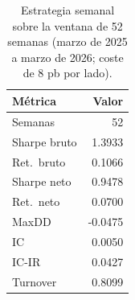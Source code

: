 \begin{table}[htbp]
\centering
\caption{Estrategia semanal sobre la ventana de 52 semanas (marzo de 2025 a marzo de
2026; coste de 8 pb por lado).}
\label{tab:weekly-summary}
\small
\begin{tabular}{lr}
\toprule
Métrica & Valor \\
\midrule
Semanas        & 52 \\
Sharpe bruto   & 1.3933 \\
Ret.\ bruto    & 0.1066 \\
Sharpe neto    & 0.9478 \\
Ret.\ neto     & 0.0700 \\
MaxDD          & -0.0475 \\
IC             & 0.0050 \\
IC-IR          & 0.0427 \\
Turnover       & 0.8099 \\
\bottomrule
\end{tabular}
\end{table}
